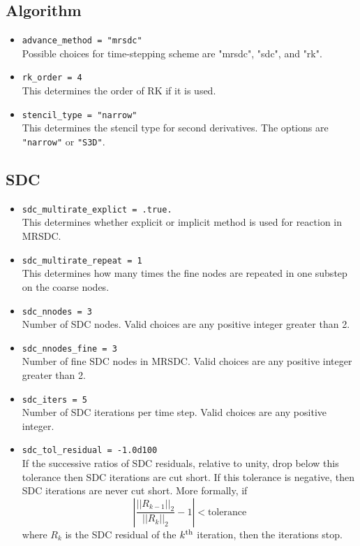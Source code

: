 \documentclass[11pt,letterpaper]{article}
\begin{document}
\subsection{Algorithm}

\begin{itemize}
\item {\tt advance\_method = "mrsdc"}\\
  Possible choices for time-stepping scheme are "mrsdc", "sdc", and "rk".
\item {\tt rk\_order = 4}\\
  This determines the order of RK if it is used.
\item {\tt stencil\_type = "narrow"}\\
  This determines the stencil type for second derivatives.  The
  options are {\tt "narrow"} or {\tt "S3D"}. 
\end{itemize}

\subsection{SDC}

\begin{itemize}
\item {\tt sdc\_multirate_explict = .true.}\\
  This determines whether explicit or implicit method is used for
  reaction in MRSDC.
\item {\tt sdc\_multirate_repeat = 1}\\
  This determines how many times the fine nodes are repeated in one
  substep on the coarse nodes.
\item {\tt sdc\_nnodes = 3}\\
  Number of SDC nodes.  Valid choices are any positive integer greater
  than 2.
\item {\tt sdc\_nnodes_fine = 3}\\
  Number of fine SDC nodes in MRSDC.  Valid choices are any positive
  integer greater than 2.
\item {\tt sdc\_iters = 5}\\
  Number of SDC iterations per time step.  Valid choices are any
  positive integer.
\item {\tt sdc\_tol\_residual = -1.0d100}\\
  If the successive ratios of SDC residuals, relative to unity, drop
  below this tolerance then SDC iterations are cut short.  If this
  tolerance is negative, then SDC iterations are never cut short.
  More formally, if
  \begin{equation*}
    \left| \frac{||R_{k-1}||_2}{||R_k||_2} - 1 \right| < \text{tolerance}
  \end{equation*}
  where $R_k$ is the SDC residual of the $k^{\rm th}$ iteration, then
  the iterations stop.
\end{itemize}
\end{document}
